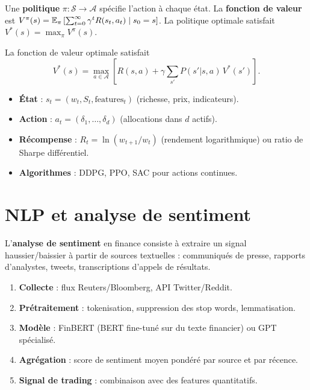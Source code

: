 \begin{definition}
Une \textbf{politique} $\pi : \mathcal{S} \to \mathcal{A}$ sp\'ecifie l'action
\`a chaque \'etat. La \textbf{fonction de valeur} est
$V^\pi(s) = \mathbb{E}_\pi\left[\sum_{t=0}^\infty \gamma^t R(s_t, a_t) \mid s_0 = s\right]$.
La politique optimale satisfait $V^*(s) = \max_\pi V^\pi(s)$.
\end{definition}

\begin{theoreme}
La fonction de valeur optimale satisfait
\[
    V^*(s) = \max_{a \in \mathcal{A}} \left[R(s, a)
    + \gamma \sum_{s'} P(s'|s, a)\,V^*(s')\right].
\]
\end{theoreme}

\begin{proposition}
\begin{itemize}
    \item \textbf{\'Etat} : $s_t = (w_t, S_t, \text{features}_t)$ (richesse,
    prix, indicateurs).
    \item \textbf{Action} : $a_t = (\delta_1, \ldots, \delta_d)$ (allocations
    dans $d$ actifs).
    \item \textbf{R\'ecompense} : $R_t = \ln(w_{t+1}/w_t)$ (rendement
    logarithmique) ou ratio de Sharpe diff\'erentiel.
    \item \textbf{Algorithmes} : DDPG, PPO, SAC pour actions continues.
\end{itemize}
\end{proposition}

\section{NLP et analyse de sentiment}

\begin{definition}
L'\textbf{analyse de sentiment} en finance consiste \`a extraire un signal
haussier/baissier \`a partir de sources textuelles : communiqu\'es de presse,
rapports d'analystes, tweets, transcriptions d'appels de r\'esultats.
\end{definition}

\begin{proposition}
\begin{enumerate}
    \item \textbf{Collecte} : flux Reuters/Bloomberg, API Twitter/Reddit.
    \item \textbf{Pr\'etraitement} : tokenisation, suppression des stop words,
    lemmatisation.
    \item \textbf{Mod\`ele} : FinBERT (BERT fine-tun\'e sur du texte financier)
    ou GPT sp\'ecialis\'e.
    \item \textbf{Agr\'egation} : score de sentiment moyen pond\'er\'e par
    source et par r\'ecence.
    \item \textbf{Signal de trading} : combinaison avec des features quantitatifs.
\end{enumerate}
\end{proposition}

